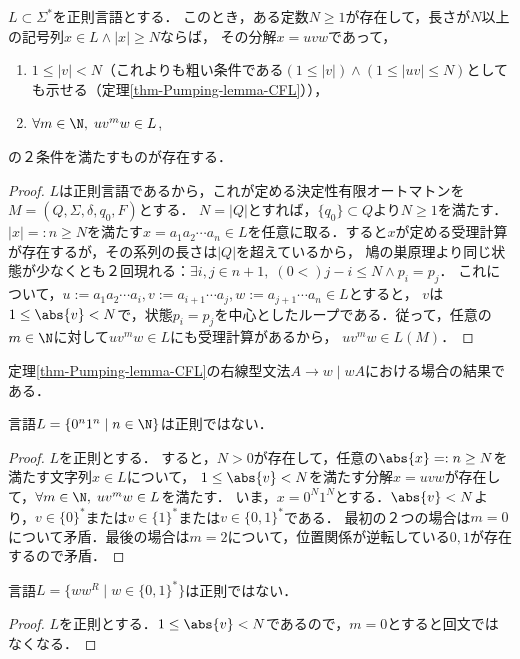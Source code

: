 \begin{theorem}\label{thm-Pumpimg-lemma}
    $L\subset\Sigma^*$を正則言語とする．
    このとき，ある定数$N\ge 1$が存在して，長さが$N$以上の記号列$x\in L\land |x|\ge N$ならば，
    その分解$x=uvw$であって，
    \begin{enumerate}
        \item $1\le |v|<N$（これよりも粗い条件である$(1\le |v|)\land (1\le|uv|\le N)$としても示せる（定理\ref{thm-Pumping-lemma-CFL}）），
        \item $\forall m\in\N,\; uv^mw\in L$,
    \end{enumerate}
    の２条件を満たすものが存在する．
\end{theorem}
\begin{proof}
    $L$は正則言語であるから，これが定める決定性有限オートマトンを$M=(Q,\Sigma,\delta,q_0,F)$とする．
    $N=|Q|$とすれば，$\{q_0\}\subset Q$より$N\ge 1$を満たす．
    $|x|=:n\ge N$を満たす$x=a_1a_2\cdots a_n\in L$を任意に取る．すると$x$が定める受理計算が存在するが，その系列の長さは$|Q|$を超えているから，
    鳩の巣原理より同じ状態が少なくとも２回現れる：$\exists i,j\in n+1,\;(0<)j-i\le N\land p_i=p_j$．
    これについて，$u:=a_1a_2\cdots a_i,v:=a_{i+1}\cdots a_j,w:=a_{j+1}\cdots a_n\in L$とすると，
    $v$は$1\le\abs{v}< N$で，状態$p_i=p_j$を中心としたループである．従って，任意の$m\in\N$に対して$uv^mw\in L$にも受理計算があるから，
    $uv^mw\in L(M)$．
\end{proof}
\begin{remarks}
    定理\ref{thm-Pumping-lemma-CFL}の右線型文法$A\to w\mid wA$における場合の結果である．
\end{remarks}

\begin{corollary}
    言語$L=\{0^n1^n\mid n\in\N\}$は正則ではない．
\end{corollary}
\begin{proof}
    $L$を正則とする．
    すると，$N>0$が存在して，任意の$\abs{x}=:n\ge N$を満たす文字列$x\in L$について，
    $1\le\abs{v}<N$を満たす分解$x=uvw$が存在して，$\forall m\in\N,\;uv^mw\in L$を満たす．
    いま，$x=0^N1^N$とする．$\abs{v}<N$より，$v\in\{0\}^*$または$v\in\{1\}^*$または$v\in\{0,1\}^*$である．
    最初の２つの場合は$m=0$について矛盾．最後の場合は$m=2$について，位置関係が逆転している$0,1$が存在するので矛盾．
\end{proof}

\begin{corollary}[回文]
    言語$L=\{ww^R\mid w\in\{0,1\}^*\}$は正則ではない．
\end{corollary}
\begin{proof}
    $L$を正則とする．$1\le\abs{v}<N$であるので，$m=0$とすると回文ではなくなる．
\end{proof}

